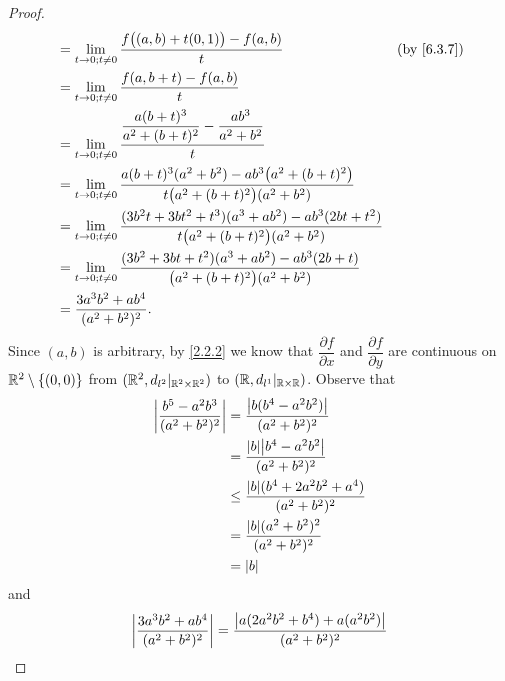 \begin{proof}
\begin{align*}
     & = \lim_{t \to 0 ; t \neq 0} \dfrac{f\big((a, b) + t(0, 1)\big) - f(a, b)}{t}                                                             &  & \by{6.3.7} \\
     & = \lim_{t \to 0 ; t \neq 0} \dfrac{f(a, b + t) - f(a, b)}{t}                                                                                             \\
     & = \lim_{t \to 0 ; t \neq 0} \dfrac{\dfrac{a (b + t)^3}{a^2 + (b + t)^2} - \dfrac{ab^3}{a^2 + b^2}}{t}                                                    \\
     & = \lim_{t \to 0 ; t \neq 0} \dfrac{a (b + t)^3 (a^2 + b^2) - a b^3 \big(a^2 + (b + t)^2\big)}{t \big(a^2 + (b + t)^2\big) (a^2 + b^2)}                   \\
     & = \lim_{t \to 0 ; t \neq 0} \dfrac{(3 b^2 t + 3 b t^2 + t^3) (a^3 + a b^2) - a b^3 (2bt + t^2)}{t \big(a^2 + (b + t)^2\big) (a^2 + b^2)}                 \\
     & = \lim_{t \to 0 ; t \neq 0} \dfrac{(3 b^2 + 3 b t + t^2) (a^3 + a b^2) - a b^3 (2b + t)}{\big(a^2 + (b + t)^2\big) (a^2 + b^2)}                          \\
     & = \dfrac{3 a^3 b^2 + a b^4}{(a^2 + b^2)^2}.
  \end{align*}
  Since \((a, b)\) is arbitrary, by \cref{2.2.2} we know that \(\dfrac{\partial f}{\partial x}\) and \(\dfrac{\partial f}{\partial y}\) are continuous on \(\mathbb{R}^2 \setminus \left\lbrace(0, 0)\right\rbrace\) from \((\mathbb{R}^2, d_{l^2}|_{\mathbb{R}^2 \times \mathbb{R}^2})\) to \((\mathbb{R}, d_{l^1}|_{\mathbb{R} \times \mathbb{R}})\).
  Observe that
  \begin{align*}
    \abs{\dfrac{b^5 - a^2 b^3}{(a^2 + b^2)^2}} & = \dfrac{\abs{b (b^4 - a^2 b^2)}}{(a^2 + b^2)^2}            \\
                                               & = \dfrac{\abs{b} \abs{b^4 - a^2 b^2}}{(a^2 + b^2)^2}        \\
                                               & \leq \dfrac{\abs{b} (b^4 + 2 a^2 b^2 + a^4)}{(a^2 + b^2)^2} \\
                                               & = \dfrac{\abs{b} (a^2 + b^2)^2}{(a^2 + b^2)^2}              \\
                                               & = \abs{b}
  \end{align*}
  and
  \begin{align*}
    \abs{\dfrac{3 a^3 b^2 + a b^4}{(a^2 + b^2)^2}} & = \dfrac{\abs{a (2 a^2 b^2 + b^4) + a (a^2 b^2)}}{(a^2 + b^2)^2}                              \\

\end{align*}
\end{proof}
